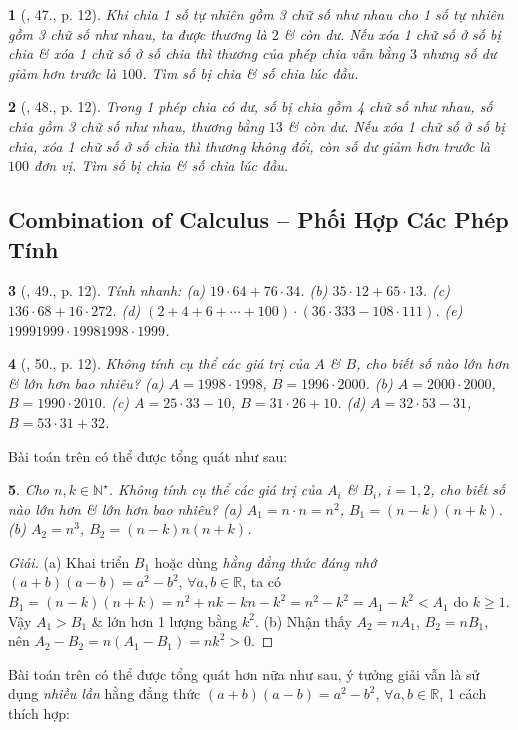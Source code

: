 \documentclass{article}
\newtheorem{baitoan}{}
\begin{document}
\begin{baitoan}[\cite{Binh_Toan_6_tap_1}, 47., p. 12]
	Khi chia 1 số tự nhiên gồm 3 chữ số như nhau cho 1 số tự nhiên gồm 3 chữ số như nhau, ta được thương là $2$ \& còn dư. Nếu xóa 1 chữ số ở số bị chia \& xóa 1 chữ số ở số chia thì thương của phép chia vẫn bằng $3$ nhưng số dư giảm hơn trước là $100$. Tìm số bị chia \& số chia lúc đầu.
\end{baitoan}

\begin{baitoan}[\cite{Binh_Toan_6_tap_1}, 48., p. 12]
	Trong 1 phép chia có dư, số bị chia gồm 4 chữ số như nhau, số chia gồm 3 chữ số như nhau, thương bằng $13$ \& còn dư. Nếu xóa 1 chữ số ở số bị chia, xóa 1 chữ số ở số chia thì thương không đổi, còn số dư giảm hơn trước là $100$ đơn vị. Tìm số bị chia \& số chia lúc đầu.
\end{baitoan}

\subsection{Combination of Calculus -- Phối Hợp Các Phép Tính}

\begin{baitoan}[\cite{Binh_Toan_6_tap_1}, 49., p. 12]
	Tính nhanh: (a) $19\cdot64 + 76\cdot34$. (b) $35\cdot12 + 65\cdot13$. (c) $136\cdot68 + 16\cdot272$. (d) $(2 + 4 + 6 + \cdots + 100)\cdot(36\cdot333 - 108\cdot111)$. (e) $19991999\cdot19981998\cdot1999$.
\end{baitoan}

\begin{baitoan}[\cite{Binh_Toan_6_tap_1}, 50., p. 12]
	Không tính cụ thể các giá trị của $A$ \& $B$, cho biết số nào lớn hơn \& lớn hơn bao nhiêu? (a) $A = 1998\cdot1998$, $B = 1996\cdot2000$. (b) $A = 2000\cdot2000$, $B = 1990\cdot2010$. (c) $A = 25\cdot33 - 10$, $B = 31\cdot26 + 10$. (d) $A = 32\cdot53 - 31$, $B = 53\cdot31 + 32$.
\end{baitoan}

Bài toán trên có thể được tổng quát như sau:

\begin{baitoan}
	Cho $n,k\in\mathbb{N}^\star$. Không tính cụ thể các giá trị của $A_i$ \& $B_i$, $i = 1,2$, cho biết số nào lớn hơn \& lớn hơn bao nhiêu? (a) $A_1 = n\cdot n = n^2$, $B_1 = (n - k)(n + k)$. (b) $A_2 = n^3$, $B_2 = (n - k)n(n + k)$.
\end{baitoan}

\begin{proof}[Giải]
	(a) Khai triển $B_1$ hoặc dùng \textit{hằng đẳng thức đáng nhớ} $(a + b)(a - b) = a^2 - b^2$, $\forall a,b\in\mathbb{R}$, ta có $B_1 = (n - k)(n + k) = n^2 + nk - kn - k^2 = n^2 - k^2 = A_1 - k^2 < A_1$ do $k\ge 1$. Vậy $A_1 > B_1$ \& lớn hơn 1 lượng bằng $k^2$. (b) Nhận thấy $A_2 = nA_1$, $B_2 = nB_1$, nên $A_2 - B_2 = n(A_1 - B_1) = nk^2 > 0$.
\end{proof}
Bài toán trên có thể được tổng quát hơn nữa như sau, ý tưởng giải vẫn là sử dụng \textit{nhiều lần} hằng đẳng thức $(a + b)(a - b) = a^2 - b^2$, $\forall a,b\in\mathbb{R}$, 1 cách thích hợp:
\end{document}

